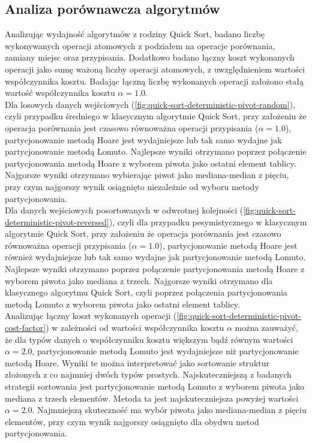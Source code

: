 \subsection{Analiza porównawcza algorytmów}

Analizując wydajność algorytmów z rodziny Quick Sort, badano liczbę wykonywanych operacji atomowych z podziałem na operacje porównania, zamiany miejsc oraz przypisania. Dodatkowo badano łączny koszt wykonanych operacji jako sumę ważoną liczby operacji atomowych, z uwzględnieniem wartości współczynnika kosztu. Badając łączną liczbę wykonanych operacji założono stałą wartość współczynnika kosztu $\alpha = 1.0$.\\

Dla losowych danych wejściowych (\ref{fig:quick-sort-deterministic-pivot-random}), czyli przypadku średniego w klasycznym algorytmie Quick Sort, przy założeniu że operacja porównania jest czasowo równoważna operacji przypisania ($\alpha=1.0$), partycjonowanie metodą Hoare jest wydajniejsze lub tak samo wydajne jak partycjonowanie metodą Lomuto. Najlepsze wyniki otrzymano poprzez połączenie partycjonowania metodą Hoare z wyborem piwota jako ostatni element tablicy. Najgorsze wyniki otrzymano wybierając piwot jako mediana-median z pięciu, przy czym najgorszy wynik osiągnięto niezależnie od wyboru metody partycjonowania.\\

Dla danych wejściowych posortowanych w odwrotnej kolejności (\ref{fig:quick-sort-deterministic-pivot-reversed}), czyli dla przypadku pesymistycznego w klasycznym algorytmie Quick Sort, przy założeniu że operacja porównania jest czasowo równoważna operacji przypisania ($\alpha=1.0$), partycjonowanie metodą Hoare jest również wydajniejsze lub tak samo wydajne jak partycjonowanie metodą Lomuto. Najlepsze wyniki otrzymano poprzez połączenie partycjonowania metodą Hoare z wyborem piwota jako mediana z trzech. Najgorsze wyniki otrzymano dla klasycznego algorytmu Quick Sort, czyli poprzez połączenia partycjonowania metodą Lomuto z wyborem piwota jako ostatni element tablicy.\\

Analizując łączny koszt wykonanych operacji (\ref{fig:quick-sort-deterministic-pivot-cost-factor}) w zależności od wartości współczynnika kosztu $\alpha$ można zauważyć, że dla typów danych o współczynniku kosztu większym bądź równym wartości $\alpha = 2.0$, partycjonowanie metodą Lomuto jest wydajniejsze niż partycjonowanie metodą Hoare. Wyniki te można interpretować jako sortowanie struktur złożonych z co najmniej dwóch typów prostych. Najskuteczniejszą z badanych strategii sortowania jest partycjonowanie metodą Lomuto z wyborem piwota jako mediana z trzech elementów. Metoda ta jest najskuteczniejsza powyżej wartości $\alpha = 2.0$. Najmniejszą skuteczność ma wybór piwota jako mediana-median z pięciu elementów, przy czym wynik najgorszy osiągnięto dla obydwu metod partycjonowania.\\

